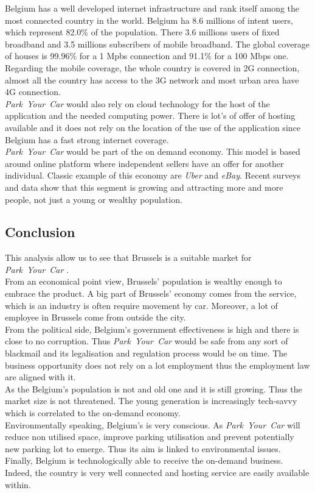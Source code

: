 \documentclass[12pt,a4paper,oneside]{book}
\newcommand{\bp}{\textit{Park~Your~Car }}
\begin{document}
Belgium has a well developed internet infrastructure and rank itself among the most connected country in the world. Belgium ha 8.6 millions of intent users, which represent 82.0\% of the population.\cite{intuser} There 3.6 millions users of fixed broadband and 3.5 millions subscribers of mobile broadband.\cite{intsub} The global coverage of houses is 99.96\% for a 1 Mpbs connection and 91.1\% for a 100 Mbps one.\cite{fixcov} Regarding the mobile coverage, the whole country is covered in 2G connection, almost all the country has access to the 3G network and most urban area have 4G connection.\cite{mobcov}\\

\bp would also rely on cloud technology for the host of the application and the needed computing power. There is lot's of offer of hosting available and it does not rely on the location of the use of the application since Belgium has a fast strong internet coverage.\\

\bp would be part of the on demand economy. This model is based around online platform where independent sellers have an offer for another individual. Classic example of this economy are \textit{Uber} and \textit{eBay}. Recent surveys and data show that this segment is growing and attracting more and more people, not just a young or wealthy population.\cite{odegrow}

\subsection{Conclusion}
This analysis allow us to see that Brussels is a suitable market for \bp.\\
From an economical point view, Brussels' population is wealthy enough to embrace the product. A big part of Brussels' economy comes from the service, which is an industry is often require movement by car. Moreover, a lot of employee in Brussels come from outside the city.\\
From the political side, Belgium's government effectiveness is high and there is close to no corruption. Thus \bp would be safe from any sort of blackmail and its legalisation and regulation process would be on time. The business opportunity does not rely on a lot employment thus the employment law are aligned with it.\\
As the Belgium's population is not and old one and it is still growing. Thus the market size is not threatened. The young generation is increasingly tech-savvy which is correlated to the on-demand economy.\\
Environmentally speaking, Belgium's is very conscious. As \bp will reduce non utilised space, improve parking utilisation and prevent potentially new parking lot to emerge. Thus its aim is linked to environmental issues.\\
Finally, Belgium is technologically able to receive the on-demand business. Indeed, the country is very well connected and hosting service are easily available within.
\end{document}
